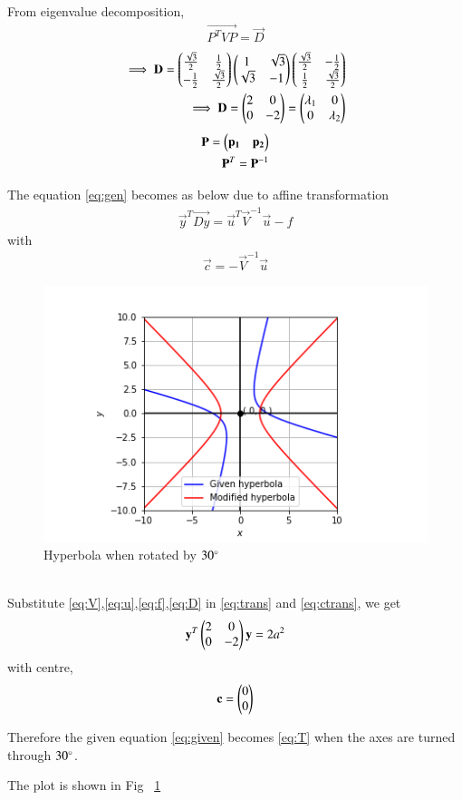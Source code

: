 \documentclass[journal,12pt,twocolumn]{IEEEtran}
\begin{document}
From eigenvalue decomposition,
\begin{align}
    \vec{P^TVP}=\vec{D}\label{eq:eigval}
\end{align}
\begin{align}
    \implies\mathbf{D}=\begin{pmatrix}\frac{\sqrt{3}}{2} & \frac{1}{2} \\ -\frac{1}{2} & \frac{\sqrt{3}}{2}\end{pmatrix}\begin{pmatrix}1 & \sqrt{3} \\ \sqrt{3} & -1\end{pmatrix}\begin{pmatrix}\frac{\sqrt{3}}{2} & -\frac{1}{2} \\ \frac{1}{2} & \frac{\sqrt{3}}{2}\end{pmatrix}\\
    \implies\mathbf{D}=\begin{pmatrix}2 & 0 \\ 0 & -2\end{pmatrix}=\begin{pmatrix}\lambda_1 & 0 \\ 0 & \lambda_2\end{pmatrix}\label{eq:D}
\end{align}
\begin{align}
    \mathbf{P}=\begin{pmatrix}\mathbf{p_1} & \mathbf{p_2}\end{pmatrix}\\
    \mathbf{P}^T=\mathbf{P}^{-1}
\end{align}

The equation \eqref{eq:gen} becomes as below due to affine transformation
\begin{align}
    \vec{y}^T\vec{Dy}=\vec{u}^T\vec{V}^{-1}\vec{u}-f\label{eq:trans}
\end{align}
with 
\begin{align}
    \vec{c}=-\vec{V}^{-1}\vec{u}\label{eq:ctrans}
\end{align}
\renewcommand{\thefigure}{1}
\begin{figure}[ht!]
    \centering
    \includegraphics[width=\columnwidth]{Figure}
    \caption{Hyperbola when rotated by $30\degree$}
    \label{fig:figure1}
\end{figure}\\
Substitute \eqref{eq:V},\eqref{eq:u},\eqref{eq:f},\eqref{eq:D} in \eqref{eq:trans} and \eqref{eq:ctrans}, we get
\begin{align}
    \mathbf{y}^T\begin{pmatrix}2 & 0 \\ 0 & -2\end{pmatrix}\mathbf{y}=2a^2\label{eq:T}
\end{align}
with centre,
\begin{align}
    \mathbf{c}=\begin{pmatrix}0 \\ 0\end{pmatrix}
\end{align}

Therefore the given equation \eqref{eq:given} becomes \eqref{eq:T} when the axes are turned through $30\degree$.

The plot is shown in Fig ~\ref{fig:figure1}
\end{document}
